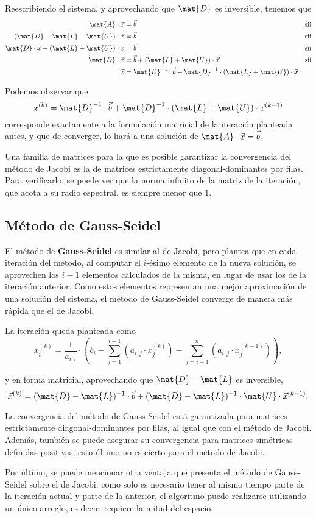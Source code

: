 Reescribiendo el sistema, y aprovechando que $\mat{D}$ es inversible, tenemos
que
\[ \begin{aligned}
    \mat{A} \cdot \vec{x} &= \vec{b}
        & \text{sii} \\
    (\mat{D} - \mat{L} - \mat{U}) \cdot \vec{x} &= \vec{b}
        & \text{sii} \\
    \mat{D} \cdot \vec{x} - (\mat{L} + \mat{U}) \cdot \vec{x} &= \vec{b}
        & \text{sii} \\
    \mat{D} \cdot \vec{x} &= \vec{b} + (\mat{L} + \mat{U}) \cdot \vec{x}
        & \text{sii} \\
    \vec{x} &= \mat{D}^{-1} \cdot \vec{b}
        + \mat{D}^{-1} \cdot (\mat{L} + \mat{U}) \cdot \vec{x}
\end{aligned} \]

Podemos observar que
\[ \vec{x}^{(k)} = \mat{D}^{-1} \cdot \vec{b}
    + \mat{D}^{-1} \cdot (\mat{L} + \mat{U}) \cdot \vec{x}^{(k-1)}\]
corresponde exactamente a la formulación matricial de la iteración planteada
antes, y que de converger, lo hará a una solución de $\mat{A} \cdot \vec{x}
= \vec{b}$.

Una familia de matrices para la que es posible garantizar la convergencia del
método de Jacobi es la de matrices estrictamente diagonal-dominantes por
filas. Para verificarlo, se puede ver que la norma infinito de la matriz de la
iteración, que acota a su radio espectral, es siempre menor que $1$.

\subsection{Método de Gauss-Seidel}
El método de \textbf{Gauss-Seidel} es similar al de Jacobi, pero plantea
que en cada iteración del método, al computar el $i$-ésimo elemento de
la nueva solución, se aprovechen los $i-1$ elementos calculados de la misma,
en lugar de usar los de la iteración anterior. Como estos elementos
representan una mejor aproximación de una solución del sistema, el método
de Gauss-Seidel converge de manera más rápida que el de Jacobi.

La iteración queda planteada como
\[ x^{(k)}_i = \frac{1}{a_{i,i}} \cdot \left( b_i
    - \sum_{j=1}^{i-1}
        \left( a_{i,j} \cdot x^{(k)}_j \right)
    - \sum_{j=i+1}^{n}
        \left( a_{i,j} \cdot x^{(k-1)}_j \right) \right), \]

y en forma matricial, aprovechando que $\mat{D} - \mat{L}$ es inversible,
\[ \vec{x}^{(k)} = (\mat{D} - \mat{L})^{-1} \cdot \vec{b}
    + (\mat{D} - \mat{L})^{-1} \cdot \mat{U} \cdot \vec{x}^{(k-1)}. \]

La convergencia del método de Gauss-Seidel está garantizada para matrices
estrictamente diagonal-dominantes por filas, al igual que con el método de
Jacobi. Además, también se puede asegurar su convergencia para matrices
simétricas definidas positivas; esto último no es cierto para el método de
Jacobi.

Por último, se puede mencionar otra ventaja que presenta el método de Gauss-Seidel sobre el de Jacobi: como solo es necesario tener al mismo tiempo
parte de la iteración actual y parte de la anterior, el algoritmo puede
realizarse utilizando un único arreglo, es decir, requiere la mitad del
espacio.
